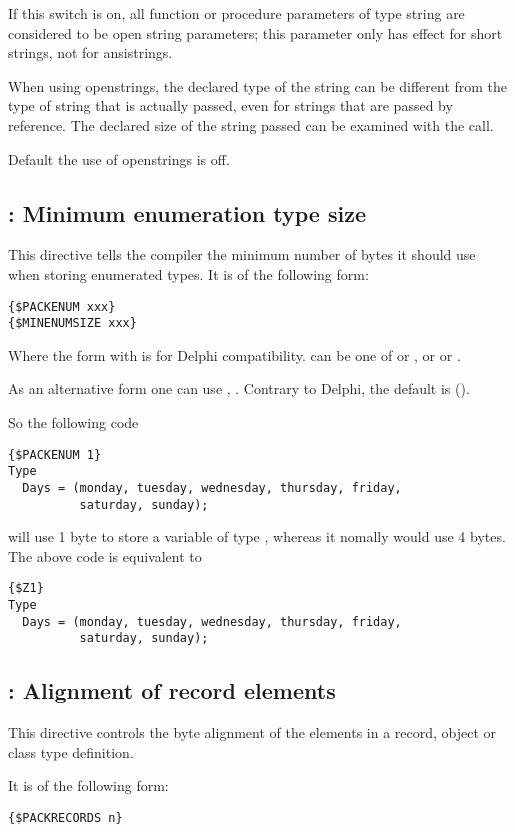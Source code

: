 If this switch is on, all function or procedure parameters of type string
are considered to be open string parameters; this parameter only has effect
for short strings, not for ansistrings.

When using openstrings, the declared type of the string can be different
from the type of string that is actually passed, even for strings that are
passed by reference. The declared size of the string passed can be examined
with the  call.

Default the use of openstrings is off.

\subsection{ : Minimum enumeration type size}

This directive tells the compiler the minimum number of bytes it should
use when storing enumerated types. It is of the following form:
\begin{verbatim}
{$PACKENUM xxx}
{$MINENUMSIZE xxx}
\end{verbatim}
Where the form with  is for Delphi compatibility.
 can be one of  or , or  or
.

As an alternative form one can use , 
. Contrary to Delphi, the default is ().

So the following code
\begin{verbatim}
{$PACKENUM 1}
Type
  Days = (monday, tuesday, wednesday, thursday, friday,
          saturday, sunday);
\end{verbatim}
will use 1 byte to store a variable of type , whereas it nomally
would use 4 bytes. The above code is equivalent to
\begin{verbatim}
{$Z1}
Type
  Days = (monday, tuesday, wednesday, thursday, friday,
          saturday, sunday);
\end{verbatim}


\subsection{ : Alignment of record elements}

This directive controls the byte alignment of the elements in a record,
object or class type definition.

It is of the following form:
\begin{verbatim}
{$PACKRECORDS n}
\end{verbatim}

